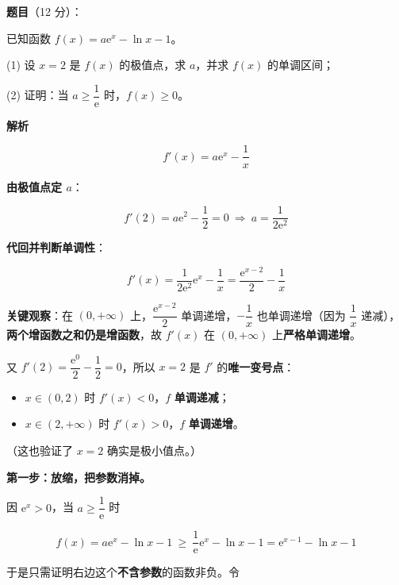 \begin{answer}

\textbf{题目}（12 分）：

已知函数 $f(x)=a\mathrm e^{x}-\ln x-1$。

  (1) 设 $x=2$ 是 $f(x)$ 的极值点，求 $a$，并求 $f(x)$ 的单调区间；

  (2) 证明：当 $a\ge\dfrac1{\mathrm e}$ 时，$f(x)\ge0$。

\textbf{解析}


\nopagebreak[4]
\[f'(x)=a\mathrm e^{x}-\frac1x\]

\textbf{由极值点定 $a$}：

\nopagebreak[4]
\[f'(2)=a\mathrm e^{2}-\frac12=0\ \Longrightarrow\ a=\frac1{2\mathrm e^{2}}\]

\textbf{代回并判断单调性}：

\nopagebreak[4]
\[f'(x)=\frac1{2\mathrm e^{2}}\mathrm e^{x}-\frac1x=\frac{\mathrm e^{x-2}}2-\frac1x\]

\textbf{关键观察}：在 $(0,+\infty)$ 上，$\dfrac{\mathrm e^{x-2}}2$ 单调递增，$-\dfrac1x$ 也单调递增（因为 $\dfrac1x$ 递减），\textbf{两个增函数之和仍是增函数}，故 $f'(x)$ 在 $(0,+\infty)$ 上\textbf{严格单调递增}。

又 $f'(2)=\dfrac{\mathrm e^{0}}2-\dfrac12=0$，所以 $x=2$ 是 $f'$ 的\textbf{唯一变号点}：

\begin{itemize}
\item $x\in(0,2)$ 时 $f'(x)<0$，$f$ \textbf{单调递减}；
\item $x\in(2,+\infty)$ 时 $f'(x)>0$，$f$ \textbf{单调递增}。
\end{itemize}

（这也验证了 $x=2$ 确实是极小值点。）


\textbf{第一步：放缩，把参数消掉。}

因 $\mathrm e^{x}>0$，当 $a\ge\dfrac1{\mathrm e}$ 时

\nopagebreak[4]
\[f(x)=a\mathrm e^{x}-\ln x-1\ \ge\ \frac1{\mathrm e}\mathrm e^{x}-\ln x-1=\mathrm e^{x-1}-\ln x-1\]

于是只需证明右边这个\textbf{不含参数}的函数非负。令


\end{answer}
